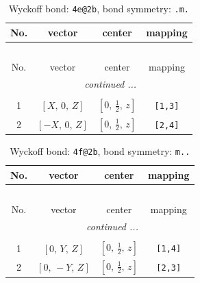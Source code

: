 \documentclass[fleqn,8pt]{jsarticle}
\begin{document}
\renewcommand{\arraystretch}{1.2}
\begin{longtable}{cccc}
\caption{Wyckoff bond: {\tt 4e@2b}, bond symmetry: {\tt .m.}}
 \\
 \hline \hline
No. & vector & center & mapping \\ \hline \endfirsthead

\multicolumn{3}{l}{\tablename\ \thetable{}} \\
 \hline \hline
No. & vector & center & mapping \\ \hline \endhead

 \hline \hline
\multicolumn{3}{r}{\footnotesize\it continued ...} \\ \endfoot

 \hline \hline
\multicolumn{3}{r}{} \\ \endlastfoot

1 & $\left[ X,\, 0,\, Z \right]$ & $\left[ 0,\, \frac{1}{2},\, z \right]$ & {\tt [1,3]} \\ \hline
2 & $\left[ - X,\, 0,\, Z \right]$ & $\left[ 0,\, \frac{1}{2},\, z \right]$ & {\tt [2,4]} \\
\end{longtable}
\renewcommand{\arraystretch}{1.2}
\begin{longtable}{cccc}
\caption{Wyckoff bond: {\tt 4f@2b}, bond symmetry: {\tt m..}}
 \\
 \hline \hline
No. & vector & center & mapping \\ \hline \endfirsthead

\multicolumn{3}{l}{\tablename\ \thetable{}} \\
 \hline \hline
No. & vector & center & mapping \\ \hline \endhead

 \hline \hline
\multicolumn{3}{r}{\footnotesize\it continued ...} \\ \endfoot

 \hline \hline
\multicolumn{3}{r}{} \\ \endlastfoot

1 & $\left[ 0,\, Y,\, Z \right]$ & $\left[ 0,\, \frac{1}{2},\, z \right]$ & {\tt [1,4]} \\ \hline
2 & $\left[ 0,\, - Y,\, Z \right]$ & $\left[ 0,\, \frac{1}{2},\, z \right]$ & {\tt [2,3]} \\
\end{longtable}
\renewcommand{\arraystretch}{1.2}
\end{document}
